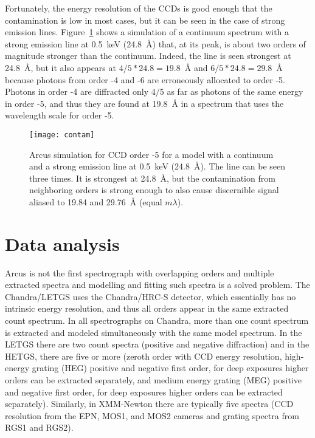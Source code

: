 \documentclass[12pt]{spieman}  %
\begin{document}
\begin{spacing}{2}
Fortunately, the energy resolution of the CCDs is good enough that the contamination is low in most cases, but it can be seen in the case of strong emission lines. Figure~\ref{fig:contam} shows a simulation of a continuum spectrum with a strong emission line at 0.5~keV (24.8~\AA{}) that, at its peak, is about two orders of magnitude stronger than the continuum. Indeed, the line is seen strongest at 24.8~\AA{}, but it also appears at $4/5 * 24.8=19.8$~\AA{} and $6/5 * 24.8=29.8$~\AA{} because photons from order -4 and -6 are erroneously allocated to order -5. Photons in order -4 are diffracted only $4/5$ as far as photons of the same energy in order -5, and thus they are found at 19.8~\AA{} in a spectrum that uses the wavelength scale for order -5.


\begin{figure}
    \centering
    \texttt{[image: contam]}
    \caption {\label{fig:contam}
    Arcus simulation for CCD order -5 for a model with a continuum and a strong emission line at 0.5~keV (24.8~\AA). The line can be seen three times. It is strongest at 24.8~\AA{}, but the contamination from neighboring orders is strong enough to also cause discernible signal aliased to 19.84 and 29.76~\AA{} (equal $m\lambda$).
}
\end{figure}

\section{Data analysis}
\label{sect:dataanalysis}
Arcus is not the first spectrograph with overlapping orders and multiple extracted spectra and modelling and fitting such spectra is a solved problem. The Chandra/LETGS\cite{10.1117/12.278846,10.1117/12.278845} uses the Chandra/HRC-S detector\cite{10.1117/12.283772}, which essentially has no intrinsic energy resolution, and thus all orders appear in the same extracted count spectrum. In all spectrographs on Chandra, more than one count spectrum is extracted and modeled simultaneously with the same model spectrum. In the LETGS there are two count spectra (positive and negative diffraction) and in the HETGS\cite{2005PASP..117.1144C}, there are five or more (zeroth order with CCD energy resolution, high-energy grating (HEG) positive and negative first order, for deep exposures higher orders can be extracted separately, and medium energy grating (MEG) positive and negative first order, for deep exposures higher orders can be extracted separately). Similarly, in XMM-Newton there are typically five spectra (CCD resolution from the EPN, MOS1, and MOS2 cameras and grating spectra from RGS1 and RGS2\cite{2001A&A...365L...7D}).


\end{spacing}
\end{document}

